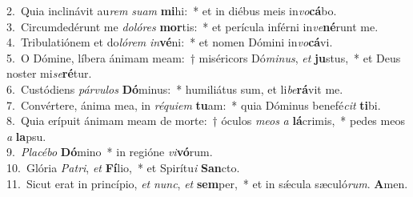 {2.~}Quia inclinávit au\textit{rem} \textit{su}\textit{am} \textbf{mi}hi:~* et in diébus meis in\textit{vo}\textbf{cá}bo.\\
{3.~}Circumdedérunt me \textit{do}\textit{ló}\textit{res} \textbf{mor}tis:~* et perícula inférni in\textit{ve}\textbf{né}runt me.\\
{4.~}Tribulatiónem et do\textit{ló}\textit{rem} \textit{in}\textbf{vé}ni:~* et nomen Dómini in\textit{vo}\textbf{cá}vi.\\
{5.~}O Dómine, líbera ánimam meam:~† miséricors Dó\textit{mi}\textit{nus}, \textit{et} \textbf{ju}stus,~* et Deus noster mi\textit{se}\textbf{ré}tur.\\
{6.~}Custódiens \textit{pár}\textit{vu}\textit{los} \textbf{Dó}minus:~* humiliátus sum, et li\textit{be}\textbf{rá}vit me.\\
{7.~}Convértere, ánima mea, in \textit{ré}\textit{qui}\textit{em} \textbf{tu}am:~* quia Dóminus benefé\textit{cit} \textbf{ti}bi.\\
{8.~}Quia erípuit ánimam meam de morte:~† óculos \textit{me}\textit{os} \textit{a} \textbf{lá}crimis,~* pedes meos \textit{a} \textbf{la}psu.\\
{9.~}\textit{Pla}\textit{cé}\textit{bo} \textbf{Dó}mino~* in regióne \textit{vi}\textbf{vó}rum.\\
{10.~}Glória \textit{Pa}\textit{tri}, \textit{et} \textbf{Fí}lio,~* et Spirítu\textit{i} \textbf{San}cto.\\
{11.~}Sicut erat in princípio, \textit{et} \textit{nunc}, \textit{et} \textbf{sem}per,~* et in sǽcula sæculó\textit{rum}. \textbf{A}men.\\
